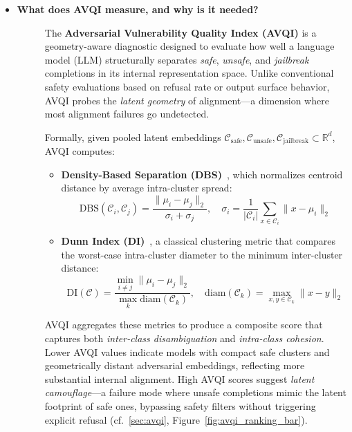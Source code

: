 \begin{itemize}[leftmargin=15pt,nolistsep]
\begin{description}
\end{description}


\item[\ding{93}] { \selectfont \textbf{What does AVQI measure, and why is it needed?}}

\begin{description}
\item[] The \textbf{Adversarial Vulnerability Quality Index (AVQI)} is a geometry-aware diagnostic designed to evaluate how well a language model (LLM) structurally separates \textit{safe}, \textit{unsafe}, and \textit{jailbreak} completions in its internal representation space. Unlike conventional safety evaluations based on refusal rate or output surface behavior, AVQI probes the \textit{latent geometry} of alignment—a dimension where most alignment failures go undetected.

Formally, given pooled latent embeddings $\mathcal{C}_{\text{safe}}, \mathcal{C}_{\text{unsafe}}, \mathcal{C}_{\text{jailbreak}} \subset \mathbb{R}^d$, AVQI computes:

\begin{itemize}[leftmargin=1em, itemsep=0pt]
\item \textbf{Density-Based Separation (DBS)}~\citep{zhang2009generalized}, which normalizes centroid distance by average intra-cluster spread:
\[
\mathrm{DBS}(\mathcal{C}_i, \mathcal{C}_j) = \frac{\|\mu_i - \mu_j\|_2}{\sigma_i + \sigma_j}, \quad \sigma_i = \frac{1}{|\mathcal{C}_i|} \sum_{x \in \mathcal{C}_i} \|x - \mu_i\|_2
\]
\item \textbf{Dunn Index (DI)}~\citep{dunn1973fuzzy}, a classical clustering metric that compares the worst-case intra-cluster diameter to the minimum inter-cluster distance:
\[
\mathrm{DI}(\mathcal{C}) = \frac{\min_{i \ne j} \|\mu_i - \mu_j\|_2}{\max_k \mathrm{diam}(\mathcal{C}_k)}, \quad \mathrm{diam}(\mathcal{C}_k) = \max_{x, y \in \mathcal{C}_k} \|x - y\|_2
\]
\end{itemize}

\noindent AVQI aggregates these metrics to produce a composite score that captures both \textit{inter-class disambiguation} and \textit{intra-class cohesion}. Lower AVQI values indicate models with compact safe clusters and geometrically distant adversarial embeddings, reflecting more substantial internal alignment. High AVQI scores suggest \textit{latent camouflage}—a failure mode where unsafe completions mimic the latent footprint of safe ones, bypassing safety filters without triggering explicit refusal (cf.~\cref{sec:avqi}, Figure~\ref{fig:avqi_ranking_bar}).


\end{description}
\end{itemize}
